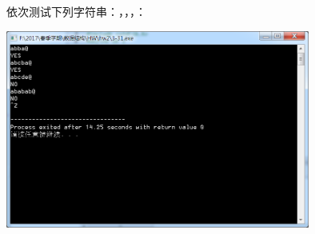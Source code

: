 \documentclass[11pt,a4paper]{ctexart}
\begin{document}
\begin{enumerate}
	依次测试下列字符串：，，，：
	
	\mbox{\includegraphics[width=0.75\textwidth]{hw2/screenshot/3-31}}
\end{enumerate}
\end{document}
